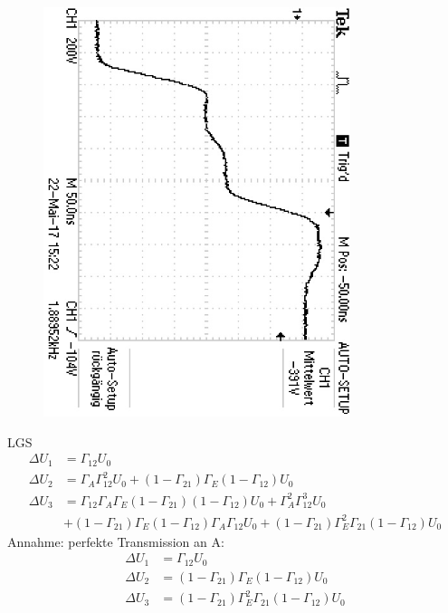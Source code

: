 \begin{figure}
	\centering
	
\end{figure}
\begin{figure}[h]
	\centering
	\includegraphics[angle = 90, origin = c, width=0.8\textwidth]{Oszilloskop/Mehrfachreflexion/F0054TEK.JPG}
	\caption{}
	\label{fig:Mehrfachreflexion}
\end{figure}
LGS
\begin{align}
	\Delta U_1 &= \Gamma_{12}U_0 \\
	\Delta U_2 &= \Gamma_A\Gamma_{12}^2U_0 + (1-\Gamma_{21})\Gamma_E(1-\Gamma_{12})U_0 \\
	\Delta U_3 &= \Gamma_{12}\Gamma_A\Gamma_E(1-\Gamma_{21})(1-\Gamma_{12})U_0 + \Gamma_A^2\Gamma_{12}^3U_0 \\
	&+ (1-\Gamma_{21})\Gamma_E(1-\Gamma_{12})\Gamma_A\Gamma_{12}U_0 + (1-\Gamma_{21})\Gamma_E^2\Gamma_{21}(1-\Gamma_{12})U_0
\end{align}
Annahme: perfekte Transmission an A:
\begin{align}
	\Delta U_1 &= \Gamma_{12}U_0 \\
	\Delta U_2 &= (1-\Gamma_{21})\Gamma_E(1-\Gamma_{12})U_0 \\
	\Delta U_3 &= (1-\Gamma_{21})\Gamma_E^2\Gamma_{21}(1-\Gamma_{12})U_0
\end{align}
